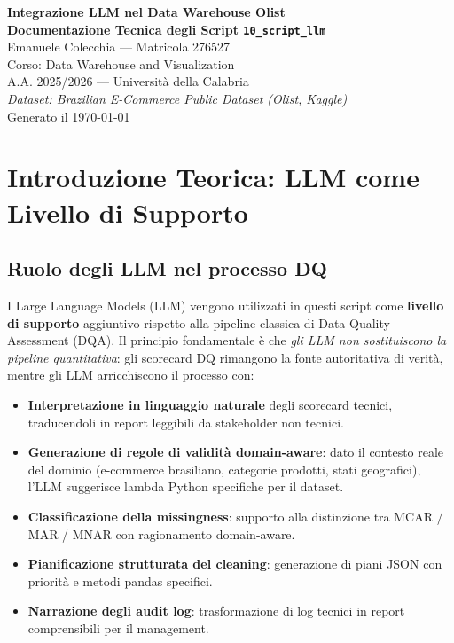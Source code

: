 \documentclass[12pt,a4paper]{article}
\begin{document}
\thispagestyle{empty}

\begin{titlepage}
  \centering
  \vspace*{3cm}
  {\LARGE\bfseries Integrazione LLM nel Data Warehouse Olist\\[0.5em]
  Documentazione Tecnica degli Script \texttt{10\_script\_llm}}\\[1.5cm]
  {\large Emanuele Colecchia — Matricola 276527}\\[0.5cm]
  {\large Corso: Data Warehouse and Visualization}\\[0.5cm]
  {\large A.A. 2025/2026 — Università della Calabria}\\[2cm]
  {\normalsize\textit{Dataset: Brazilian E-Commerce Public Dataset (Olist, Kaggle)}}\\
  \vfill
  {\small Generato il \today}
\end{titlepage}

\tableofcontents
\newpage

\section{Introduzione Teorica: LLM come Livello di Supporto}

\subsection{Ruolo degli LLM nel processo DQ}

I Large Language Models (LLM) vengono utilizzati in questi script come
\textbf{livello di supporto} aggiuntivo rispetto alla pipeline classica di
Data Quality Assessment (DQA). Il principio fondamentale è che
\textit{gli LLM non sostituiscono la pipeline quantitativa}: gli scorecard DQ
rimangono la fonte autoritativa di verità, mentre gli LLM arricchiscono il
processo con:

\begin{itemize}
  \item \textbf{Interpretazione in linguaggio naturale} degli scorecard tecnici,
        traducendoli in report leggibili da stakeholder non tecnici.
  \item \textbf{Generazione di regole di validità domain-aware}: dato il contesto
        reale del dominio (e-commerce brasiliano, categorie prodotti, stati geografici),
        l'LLM suggerisce lambda Python specifiche per il dataset.
  \item \textbf{Classificazione della missingness}: supporto alla distinzione tra
        MCAR / MAR / MNAR con ragionamento domain-aware.
  \item \textbf{Pianificazione strutturata del cleaning}: generazione di piani JSON
        con priorità e metodi pandas specifici.
  \item \textbf{Narrazione degli audit log}: trasformazione di log tecnici in
        report comprensibili per il management.
\end{itemize}
\end{document}
